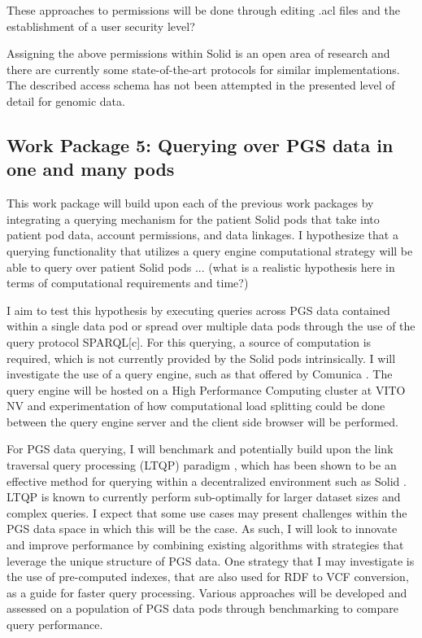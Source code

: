 \documentclass[runningheads]{llncs}
\begin{document}
These approaches to permissions will be done through editing .acl files and the establishment of a user security level?

Assigning the above permissions within Solid is an open area of research and there are currently some state-of-the-art protocols for similar implementations. The described access schema has not been attempted in the presented level of detail for genomic data.


\subsection{Work Package 5: Querying over PGS data in one and many pods}

This work package will build upon each of the previous work packages by integrating a querying mechanism for the patient Solid pods that take into patient pod data, account permissions, and data linkages. 
I hypothesize that a querying functionality that utilizes a query engine computational strategy will be able to query over patient Solid pods ... (what is a realistic hypothesis here in terms of computational requirements and time?)

I aim to test this hypothesis by executing queries across PGS data contained within a single data pod or spread over multiple data pods through the use of the query protocol SPARQL[c].  
For this querying, a source of computation is required, which is not currently provided by the Solid pods intrinsically.
I will investigate the use of a query engine, such as that offered by Comunica \cite{comunica}.
The query engine will be hosted on a High Performance Computing cluster at VITO NV and experimentation of how computational load splitting could be done between the query engine server and the client side browser will be performed. 

For PGS data querying, I will benchmark and potentially build upon the link traversal query processing (LTQP) paradigm \cite{taelman_evaluation_2023}, which has been shown to be an effective method for querying within a decentralized environment such as Solid \cite{capadisli_solid_nodate}. 
LTQP is known to currently perform sub-optimally for larger dataset sizes and complex queries. 
I expect that some use cases may present challenges within the PGS data space in which this will be the case. 
As such, I will look to innovate and improve performance by combining existing algorithms with strategies that leverage the unique structure of PGS data.
One strategy that I may investigate is the use of pre-computed indexes, that are also used for RDF to VCF conversion, as a guide for faster query processing.
Various approaches will be developed and assessed on a population of PGS data pods through benchmarking to compare query performance. 
\end{document}
